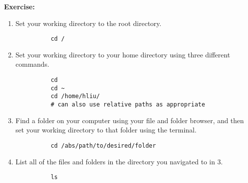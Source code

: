 \documentclass[12pt]{article}
\begin{document}
		  \textbf{Exercise:}
		  
		  \begin{enumerate}
		  \item Set your working directory to the root directory.
		  \begin{verbatim}
		  cd /
		  \end{verbatim}
		  
		  \item Set your working directory to your home directory using three different commands.
		  
		  \begin{verbatim}
		  cd
		  cd ~
		  cd /home/hliu/
		  # can also use relative paths as appropriate
		  \end{verbatim}
		  
		  \item Find a folder on your computer using your file and folder browser, and then set your working directory to that folder using the terminal.
		  \begin{verbatim}
		  cd /abs/path/to/desired/folder
		  \end{verbatim}
		  
		  \item List all of the files and folders in the directory you navigated to in 3.
		  \begin{verbatim}
		  ls
		  \end{verbatim}
		  \end{enumerate}
		  
\end{document}
